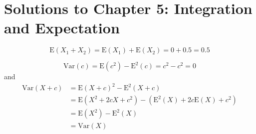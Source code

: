 \section{Solutions to Chapter 5: Integration and Expectation}
\label{sec:solutions-chapter-5}

\setcounter{Lcount}{0}
\begin{list}{5.10.}{}
\item \[
    \mathrm{E}\left(X_1 + X_2\right)
    = \mathrm{E}\left(X_1\right) + \mathrm{E}\left(X_2\right)
    = 0 + 0.5 = 0.5
  \]
  
\item \[
    \mathrm{Var}\left(c\right) = \mathrm{E}\left(c^2\right) - \mathrm{E}^2\left(c\right) = c^2 - c^2 = 0
  \]
  and
  \[
    \begin{aligned}
      \mathrm{Var}\left(X + c\right)
      & = \mathrm{E}\left(X+c\right)^2 - \mathrm{E}^2\left(X + c\right)    \\
      & = \mathrm{E}\left(X^2 + 2cX + c^2\right)
      - \left(
        \mathrm{E}^2\left(X\right) + 2c\mathrm{E}\left(X\right) + c^2
      \right)    \\
      & = \mathrm{E}\left(X^2\right) - \mathrm{E}^2\left(X\right)    \\
      & = \mathrm{Var}\left(X\right)
    \end{aligned}
      \]
\end{list}

\clearpage{}

